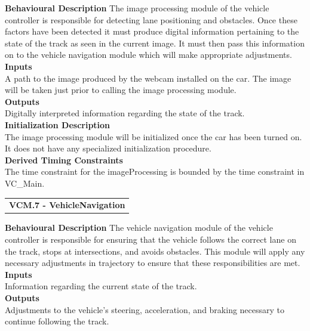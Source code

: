 \documentclass [10pt]{article}
\begin{document}
\textbf{Behavioural Description} 
    The image processing module of the vehicle controller is responsible for detecting lane positioning and obstacles. Once these factors have been detected it must produce
    digital information pertaining to the state of the track as seen in the current image. It must then pass this information on to the vehicle navigation module which will make appropriate adjustments.
    \\

\textbf{Inputs} \\
    A  path to the image produced by the webcam installed on the car. The image will be taken just prior to calling the image processing module.\\

\textbf{Outputs} \\
    Digitally interpreted information regarding the state of the track. \\

\textbf{Initialization Description} \\
    The image processing module will be initialized once the car has been turned on. It does not have any specialized initialization procedure.
    \\

\textbf{Derived Timing Constraints} \\
   The time constraint for the imageProcessing is bounded by the time constraint in VC\_Main.\\
    
    
    
    

\begin{longtable}{p{}}
\rowcolor{tableCell}\textbf{VCM.7 - VehicleNavigation} \\
\end{longtable}

\textbf{Behavioural Description} 
    The vehicle navigation module of the vehicle controller is responsible for ensuring that the vehicle follows the correct lane on the track, stops at intersections, and avoids obstacles. This module will apply any necessary adjustments in trajectory to ensure that these responsibilities are met.\\

\textbf{Inputs} \\
Information regarding the current state of the track. \\

\textbf{Outputs} \\
 Adjustments to the vehicle's steering, acceleration, and braking necessary to continue following the track.\\
\end{document}
